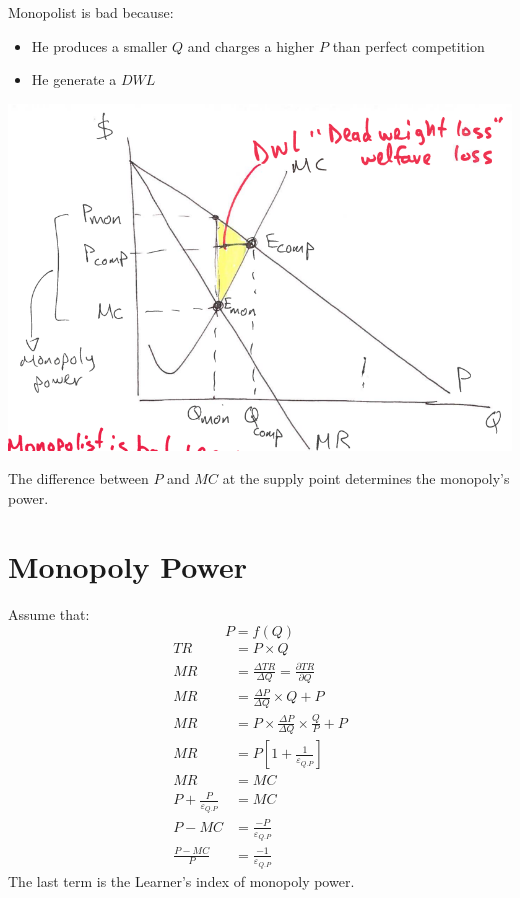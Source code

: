 \documentclass[../ECON-281-Notes.tex]{subfiles}
\begin{document}
Monopolist is bad because:
\begin{itemize}
    \item He produces a smaller \(Q\) and charges a higher \(P\) than perfect competition
    \item He generate a \(DWL\)
\end{itemize}

\includegraphics[width=\columnwidth]{assets/image_2021-11-23-12-13-29.png}

The difference between \(P\) and \(MC\) at the supply point determines the monopoly's power.

\section{Monopoly Power}
Assume that: \[
    P = f(Q)
\]
\begin{align*}
    TR &= P \times Q\\
    MR &= \frac{\Delta TR}{\Delta Q} = \frac{\partial TR}{\partial Q}\\
    MR &= \frac{\Delta P}{\Delta Q} \times Q + P \\
    MR &= P \times \frac{\Delta P}{\Delta Q} \times \frac{Q}{P} + P \\
    MR &= P[1 + \frac{1}{\varepsilon_{Q.P}}]\\
    MR &= MC \\
    P + \frac{P}{\varepsilon_{Q.P}} &= MC\\
    P - MC &= \frac{-P}{\varepsilon_{Q.P}}\\
    \frac{P - MC}{P} &= \frac{-1}{\varepsilon_{Q.P}}
\end{align*}
The last term is the Learner's index of monopoly power.
\end{document}
